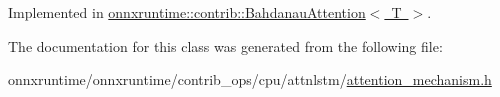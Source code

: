 Implemented in \mbox{\hyperlink{classonnxruntime_1_1contrib_1_1BahdanauAttention_af6a80756c3478056a61d6513e586ea8b}{onnxruntime\+::contrib\+::\+Bahdanau\+Attention$<$ T $>$}}.



The documentation for this class was generated from the following file\+:\begin{DoxyCompactItemize}
\item 
onnxruntime/onnxruntime/contrib\+\_\+ops/cpu/attnlstm/\mbox{\hyperlink{attention__mechanism_8h}{attention\+\_\+mechanism.\+h}}\end{DoxyCompactItemize}
